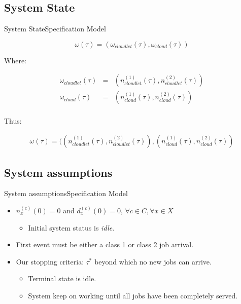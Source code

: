 \documentclass[10pt]{beamer}
\begin{document}
\subsection{System State}
\begin{frame}[fragile]{System State}{Specification Model}

\begin{equation}
\omega(\tau) = (\omega_{cloudlet}(\tau),\omega_{cloud}(\tau))
\end{equation}

Where:

\begin{equation}
\begin{array} {rcl} 
\omega_{cloudlet}(\tau) & = & (n_{cloudlet}^{(1)}(\tau),n_{cloudlet}^{(2)}(\tau)) \\
\omega_{cloud}(\tau) & = & (n_{cloud}^{(1)}(\tau),n_{cloud}^{(2)}(\tau)) \\
\end{array}
\end{equation}

Thus:

\begin{equation}
\begin{array} {rcl} 
\omega(\tau) = ((n_{cloudlet}^{(1)}(\tau),n_{cloudlet}^{(2)}(\tau)),(n_{cloud}^{(1)}(\tau),n_{cloud}^{(2)}(\tau))
\end{array}
\end{equation}
\end{frame}

\subsection{System assumptions}
\begin{frame}[fragile]{System assumptions}{Specification Model}
\begin{itemize}
\item $n_x^{(c)}(0) = 0$ and $d_x^{(c)}(0) = 0$, $\forall c \in C, \forall x \in X $
\begin{itemize}
\item Initial system status is \textit{idle}. 
\end{itemize}



\item First event must be either a class 1 or class 2 job arrival.

\item Our stopping criteria: $\tau^*$ beyond which no new jobs can arrive.
\begin{itemize}
\item Terminal state is idle.
\item System keep on working until all jobs have been completely served. 
\end{itemize}


\end{itemize}
\end{frame}
\end{document}
